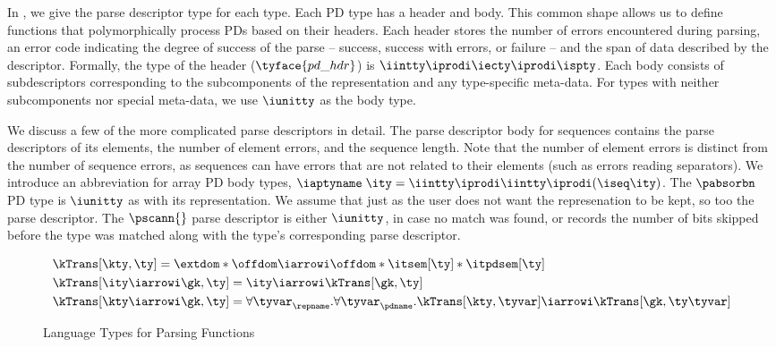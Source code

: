 In , we give the parse descriptor
type for each \ddc{} type. Each PD type has a header and body.
This common shape allows us to define functions that polymorphically
process PDs based on their headers. Each header stores the number of
errors encountered during parsing, an error code indicating the degree
of success of the parse -- success, success with errors, or failure --
and the span of data described by the descriptor.  Formally, the type
of the header  ($\tyface{pd\_hdr}$) is $\iintty \iprodi \iecty \iprodi
\ispty$.  Each body consists of subdescriptors corresponding to the
subcomponents of the representation and any type-specific meta-data. For types with neither subcomponents nor special meta-data, we
use $\iunitty$ as the body type.

We discuss a few of the more complicated parse descriptors in detail.
The parse descriptor body for sequences contains the parse descriptors of its elements,
the number of element errors, and the sequence length. Note that the
number of element errors is distinct from the number of sequence
errors, as sequences can have errors that are not related to their
elements (such as errors reading separators).  We introduce an
abbreviation for array PD body types, $\iaptyname \; \ity =
\iintty \iprodi \iintty \iprodi (\iseq \ity)$.
The $\pabsorbn$ PD
type is $\iunitty$ as with its representation. We assume that just as
the user does not want the represenation to be kept, so too the parse
descriptor.  The $\pscann{}$ parse descriptor is either $\iunitty$, in case
no match was found, or records the number of bits skipped before the
type was matched along with the type's corresponding parse descriptor.


\begin{figure}
\small
\fbox{$\kTrans[\gk,\ty] = \ity$} 
    
\begin{align*}
  &\kTrans[\kty,\ty] = \extdom * \offdom \iarrowi \offdom * \itsem[\ty] * \itpdsem[\ty]
   \\
   &\kTrans[\ity \iarrowi \gk,\ty] = \ity \iarrowi \kTrans[\gk,\ty]
   \\
   &\kTrans[\kty \iarrowi \gk,\ty] = 
      \forall\tyvar_\repname.\forall\tyvar_\pdname.
         \kTrans[\kty,\tyvar] \iarrowi \kTrans[\gk,\ty \tyvar] 
\end{align*}  
  \caption{\Implang{} Language Types for Parsing Functions}
  \label{fig:parser-types}
\end{figure}

